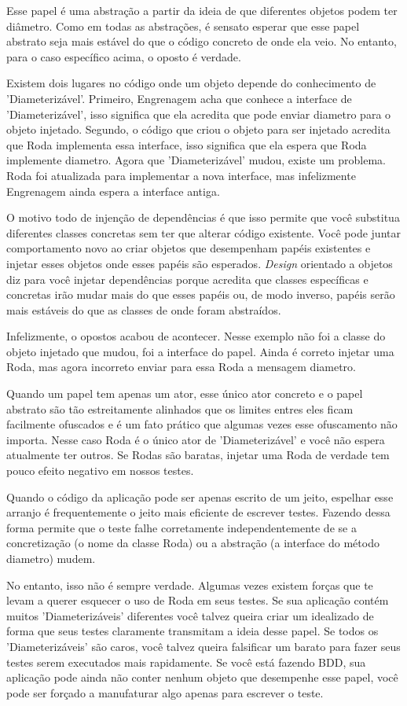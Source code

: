 Esse papel é uma abstração a partir da ideia de que diferentes objetos podem ter
diâmetro. Como em todas as abstrações, é sensato esperar que esse papel abstrato
seja mais estável do que o código concreto de onde ela veio. No entanto, para
o caso específico acima, o oposto é verdade.

Existem dois lugares no código onde um objeto depende do conhecimento de
'Diameterizável'. Primeiro, Engrenagem acha que conhece a interface de
'Diameterizável', isso significa que ela acredita que pode enviar diametro para
o objeto injetado. Segundo, o código que criou o objeto para ser injetado
acredita que Roda implementa essa interface, isso significa que ela espera que
Roda implemente diametro. Agora que 'Diameterizável' mudou, existe um problema.
Roda foi atualizada para implementar a nova interface, mas infelizmente
Engrenagem ainda espera a interface antiga.

O motivo todo de injenção de dependências é que isso permite que você
substitua diferentes classes concretas sem ter que alterar código existente.
Você pode juntar comportamento novo ao criar objetos que desempenham papéis
existentes e injetar esses objetos onde esses papéis são esperados.
\textit{Design} orientado a objetos diz para você injetar dependências porque
acredita que classes específicas e concretas irão mudar mais do que esses
papéis ou, de modo inverso, papéis serão mais estáveis do que as classes de
onde foram abstraídos.

Infelizmente, o opostos acabou de acontecer. Nesse exemplo não foi a classe
do objeto injetado que mudou, foi a interface do papel. Ainda é correto injetar
uma Roda, mas agora incorreto enviar para essa Roda a mensagem diametro.

Quando um papel tem apenas um ator, esse único ator concreto e o papel abstrato
são tão estreitamente alinhados que os limites entres eles ficam facilmente
ofuscados e é um fato prático que algumas vezes esse ofuscamento não importa.
Nesse caso Roda é o único ator de 'Diameterizável' e você não espera atualmente
ter outros. Se Rodas são baratas, injetar uma Roda de verdade tem pouco efeito
negativo em nossos testes.

Quando o código da aplicação pode ser apenas escrito de um jeito, espelhar esse
arranjo é frequentemente o jeito mais eficiente de escrever testes. Fazendo
dessa forma permite que o  teste falhe corretamente independentemente de se
a concretização (o nome da classe Roda) ou a abstração (a interface do método
diametro) mudem.

No entanto, isso não é sempre verdade. Algumas vezes existem forças que te levam
a querer esquecer o uso de Roda em seus testes. Se sua aplicação contém muitos
'Diameterizáveis' diferentes você talvez queira criar um idealizado de forma que
seus testes claramente transmitam a ideia desse papel. Se todos os
'Diameterizáveis' são caros, você talvez queira falsificar um barato para fazer
seus testes serem executados mais rapidamente. Se você está fazendo BDD, sua
aplicação pode ainda não conter nenhum objeto que desempenhe esse papel, você
pode ser forçado a manufaturar algo apenas para escrever o teste.
